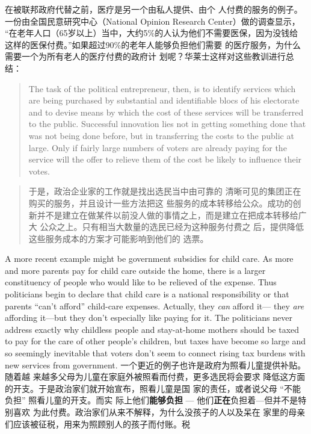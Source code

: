 \begin{paracol}{2}
\switchcolumn
在被联邦政府代替之前，医疗是另一个由私人提供、由个
人付费的服务的例子。一份由全国民意研究中心（National Opinion Research Center）做的调查显示， “在老年人口（65岁以上）当中，大约5\%的人认为他们不需要医保，因为没钱给
这样的医保付费。”如果超过90\%的老年人能够负担他们需要
的医疗服务，为什么需要一个为所有老人的医疗付费的政府计
划呢？华莱士这样对这些教训进行总结：
\switchcolumn*
\begin{quote}
The task of the political entrepreneur, then, is to identify services
which are being purchased by substantial and identifiable blocs
of his electorate and to devise means by which the cost of these
services will be transferred to the public. Successful innovation
lies not in getting something done that was not being done before, but in transferring the costs to the public at large. Only if
fairly large numbers of voters are already paying for the service will the offer to relieve them of the cost be likely to influence
their votes.
\end{quote}
\switchcolumn
\begin{quote}
于是，政治企业家的工作就是找出选民当中由可靠的
清晰可见的集团正在购买的服务，并且设计一些方法把这
些服务的成本转移给公众。成功的创新并不是建立在做某件以前没人做的事情之上，而是建立在把成本转移给广大
公众之上。只有相当大数量的选民已经为这种服务付费之
后，提供降低这些服务成本的方案才可能影响到他们的
选票。
\end{quote}
\switchcolumn*
A more recent example might be government subsidies for
child care. As more and more parents pay for child care outside
the home, there is a larger constituency of people who would
like to be relieved of the expense. Thus politicians begin to declare that child care is a national responsibility or that parents
``can't afford'' child-care expenses. Actually, they \textit{can} afford it---
they \textit{are} affording it---but they don't especially like paying for
it. The politicians never address exactly why childless people
and stay-at-home mothers should be taxed to pay for the care of
other people's children, but taxes have become so large and so
seemingly inevitable that voters don't seem to connect rising
tax burdens with new services from government.
\switchcolumn
一个更近的例子也许是政府为照看儿童提供补贴。随着越
来越多父母为儿童在家庭外被照看而付费，更多选民将会要求
降低这方面的开支。于是政治家们就开始宣布，照看儿童是国
家的责任，或者说父母 “不能负担” 照看儿童的开支。而实
际上他们\textbf{能够负担} --- 他们\textbf{正在}负担着---但并不是特别喜欢
为此付费。政治家们从来不解释，为什么没孩子的人以及呆在
家里的母亲们应该被征税，用来为照顾别人的孩子而付账。税

\end{paracol}
